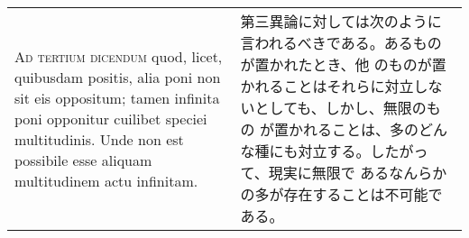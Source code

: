 \documentclass[10pt]{jsarticle} %
\begin{document}
\begin{longtable}{p{21em}p{21em}}
\\

{\scshape Ad tertium dicendum} quod, licet, quibusdam positis, alia poni non
 sit eis oppositum; tamen infinita poni opponitur cuilibet speciei
 multitudinis. Unde non est possibile esse aliquam multitudinem actu
 infinitam.

&

第三異論に対しては次のように言われるべきである。あるものが置かれたとき、他
 のものが置かれることはそれらに対立しないとしても、しかし、無限のもの
 が置かれることは、多のどんな種にも対立する。したがって、現実に無限で
 あるなんらかの多が存在することは不可能である。


\end{longtable}
\end{document}
